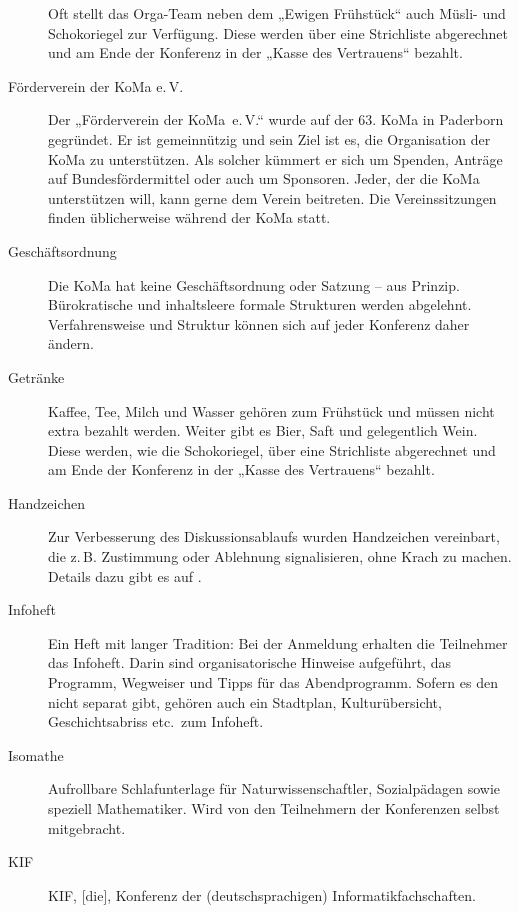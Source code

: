 \begin{description}
	Oft stellt das Orga-Team neben dem „Ewigen Frühstück“ auch Müsli- und
	Schokoriegel zur Verfügung. Diese werden über eine Strichliste abgerechnet
	und am Ende der Konferenz in der „Kasse des Vertrauens“ bezahlt.

\item[Förderverein der KoMa e.\,V.] Der „Förderverein der KoMa~e.\,V.“ wurde
	auf der 63. KoMa in Paderborn gegründet. Er ist gemeinnützig und sein Ziel
	ist es, die Organisation der KoMa zu unterstützen. Als solcher kümmert er
	sich um Spenden, Anträge auf Bundesfördermittel oder auch um Sponsoren.
	Jeder, der die KoMa unterstützen will, kann gerne dem Verein beitreten. Die
	Vereinssitzungen finden üblicherweise während der KoMa statt.

\item[Geschäftsordnung] Die KoMa hat keine Geschäftsordnung oder Satzung -- aus
	Prinzip. Bürokratische und inhaltsleere formale Strukturen werden
	abgelehnt. Verfahrensweise und Struktur können sich auf jeder Konferenz
	daher ändern.

\item[Getränke] Kaffee, Tee, Milch und Wasser gehören zum Frühstück und müssen
	nicht extra bezahlt werden. Weiter gibt es Bier, Saft und gelegentlich
	Wein. Diese werden, wie die Schokoriegel, über eine Strichliste abgerechnet
	und am Ende der Konferenz in der „Kasse des Vertrauens“ bezahlt.

\item[Handzeichen] Zur Verbesserung des Diskussionsablaufs wurden Handzeichen
	vereinbart, die z.\,B. Zustimmung oder Ablehnung signalisieren, ohne Krach
	zu machen. Details dazu gibt es auf .

\item[Infoheft] Ein Heft mit langer Tradition: Bei der Anmeldung erhalten die
	Teilnehmer das Infoheft. Darin sind organisatorische Hinweise aufgeführt,
	das Programm, Wegweiser und Tipps für das Abendprogramm. Sofern es den
	nicht separat gibt, gehören auch ein Stadtplan, Kulturübersicht,
	Geschichtsabriss etc.\ zum Infoheft.

\item[Isomathe] Aufrollbare Schlafunterlage für Naturwissenschaftler,
	Sozialpädagen sowie speziell Mathematiker. Wird von den Teilnehmern der
	Konferenzen selbst mitgebracht.

\item[KIF] KIF, [die], Konferenz der (deutschsprachigen)
	Informatikfachschaften.


\end{description}
